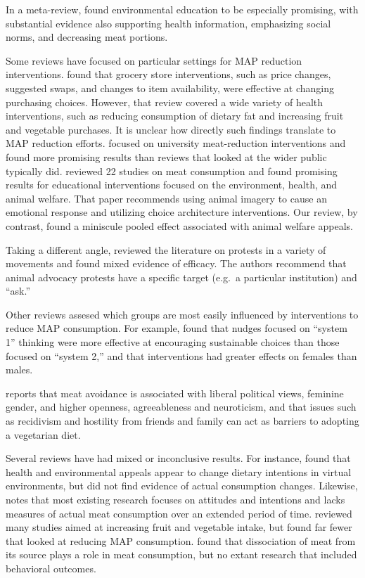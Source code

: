 \documentclass[preprint, 3p,
authoryear]{elsarticle} %
\begin{document}
In a meta-review, \citep{grundy2022} found environmental education to be
especially promising, with substantial evidence also supporting health
information, emphasizing social norms, and decreasing meat portions.

Some reviews have focused on particular settings for MAP reduction
interventions. \citep{hartmannboyce2018} found that grocery store
interventions, such as price changes, suggested swaps, and changes to
item availability, were effective at changing purchasing choices.
However, that review covered a wide variety of health interventions,
such as reducing consumption of dietary fat and increasing fruit and
vegetable purchases. It is unclear how directly such findings translate
to MAP reduction efforts. \citep{chang2023} focused on university
meat-reduction interventions and found more promising results than
reviews that looked at the wider public typically did.
\citep{harguess2020} reviewed 22 studies on meat consumption and found
promising results for educational interventions focused on the
environment, health, and animal welfare. That paper recommends using
animal imagery to cause an emotional response and utilizing choice
architecture interventions. Our review, by contrast, found a miniscule
pooled effect associated with animal welfare appeals.

Taking a different angle, \citep{adleberg2018} reviewed the literature
on protests in a variety of movements and found mixed evidence of
efficacy. The authors recommend that animal advocacy protests have a
specific target (e.g.~a particular institution) and ``ask.''

Other reviews assesed which groups are most easily influenced by
interventions to reduce MAP consumption. For example,
\citep{blackford2021} found that nudges focused on ``system 1'' thinking
were more effective at encouraging sustainable choices than those
focused on ``system 2,'' and that interventions had greater effects on
females than males.

\citep{rosenfeld2018} reports that meat avoidance is associated with
liberal political views, feminine gender, and higher openness,
agreeableness and neuroticism, and that issues such as recidivism and
hostility from friends and family can act as barriers to adopting a
vegetarian diet.

Several reviews have had mixed or inconclusive results. For instance,
\citep{bianchi2018conscious} found that health and environmental appeals
appear to change dietary intentions in virtual environments, but did not
find evidence of actual consumption changes. Likewise,
\citep{kwasny2022} notes that most existing research focuses on
attitudes and intentions and lacks measures of actual meat consumption
over an extended period of time. \citep{taufik2019} reviewed many
studies aimed at increasing fruit and vegetable intake, but found far
fewer that looked at reducing MAP consumption. \citep{benningstad2020}
found that dissociation of meat from its source plays a role in meat
consumption, but no extant research that included behavioral outcomes.
\end{document}
